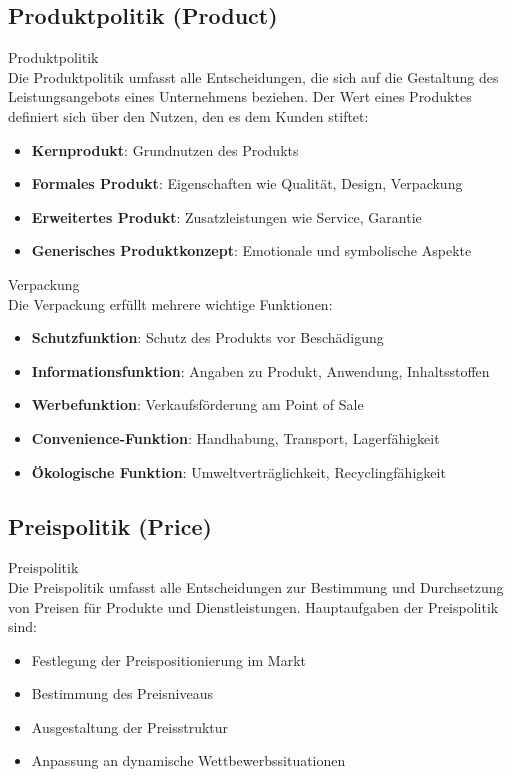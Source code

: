 \subsection{Produktpolitik (Product)}

\begin{definition}{Produktpolitik}\\
Die Produktpolitik umfasst alle Entscheidungen, die sich auf die Gestaltung des Leistungsangebots eines Unternehmens beziehen. Der Wert eines Produktes definiert sich über den Nutzen, den es dem Kunden stiftet:
\begin{itemize}
    \item \textbf{Kernprodukt}: Grundnutzen des Produkts
    \item \textbf{Formales Produkt}: Eigenschaften wie Qualität, Design, Verpackung
    \item \textbf{Erweitertes Produkt}: Zusatzleistungen wie Service, Garantie
    \item \textbf{Generisches Produktkonzept}: Emotionale und symbolische Aspekte
\end{itemize}
\end{definition}

\begin{definition}{Verpackung}\\
Die Verpackung erfüllt mehrere wichtige Funktionen:
\begin{itemize}
    \item \textbf{Schutzfunktion}: Schutz des Produkts vor Beschädigung
    \item \textbf{Informationsfunktion}: Angaben zu Produkt, Anwendung, Inhaltsstoffen
    \item \textbf{Werbefunktion}: Verkaufsförderung am Point of Sale
    \item \textbf{Convenience-Funktion}: Handhabung, Transport, Lagerfähigkeit
    \item \textbf{Ökologische Funktion}: Umweltverträglichkeit, Recyclingfähigkeit
\end{itemize}
\end{definition}

\subsection{Preispolitik (Price)}

\begin{definition}{Preispolitik}\\
Die Preispolitik umfasst alle Entscheidungen zur Bestimmung und Durchsetzung von Preisen für Produkte und Dienstleistungen. Hauptaufgaben der Preispolitik sind:
\begin{itemize}
    \item Festlegung der Preispositionierung im Markt
    \item Bestimmung des Preisniveaus
    \item Ausgestaltung der Preisstruktur
    \item Anpassung an dynamische Wettbewerbssituationen
\end{itemize}
\end{definition}

